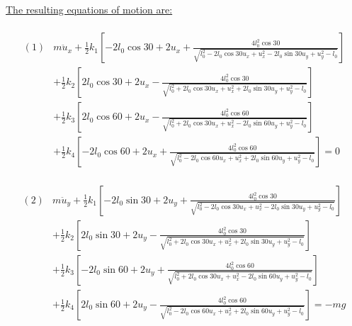 \documentclass[]{report}
\begin{document}
\underline{The resulting equations of motion are:}\\
\\
\begin{eqnarray*}
\left(1\right)& m\ddot{u}_x+\frac{1}{2}k_1 \left[-2l_0 \cos{30}+2u_x+ \frac{4 l_0^2 \cos{30}}{\sqrt{{l_0^2-2l_0 \cos{30} u_x+u_x^2-2 l_0 \sin{30} u_y+u_y^2}-l_0}}\right]\\
& +\frac{1}{2}k_2 \left[2l_0 \cos{30}+2u_x- \frac{4 l_0^2 \cos{30}}{\sqrt{{l_0^2+2l_0 \cos{30} u_x+u_x^2+2 l_0 \sin{30} u_y+u_y^2}-l_0}}\right]\\
&+\frac{1}{2}k_3 \left[2l_0 \cos{60}+2u_x- \frac{4 l_0^2 \cos{60}}{\sqrt{{l_0^2+2l_0 \cos{30} u_x+u_x^2-2 l_0 \sin{60} u_y+u_y^2}-l_0}}\right]\\
&+\frac{1}{2}k_4 \left[-2l_0 \cos{60}+2u_x+ \frac{4 l_0^2 \cos{60}}{\sqrt{{l_0^2-2l_0 \cos{60} u_x+u_x^2+2 l_0 \sin{60} u_y+u_y^2}-l_0}}\right]=0
\end{eqnarray*}
\\
\begin{eqnarray*}
\left(2\right)& m\ddot{u}_y+\frac{1}{2}k_1 \left[-2l_0 \sin{30}+2u_y+ \frac{4 l_0^2 \cos{30}}{\sqrt{{l_0^2-2l_0 \cos{30} u_x+u_x^2-2 l_0 \sin{30} u_y+u_y^2}-l_0}}\right]\\
& +\frac{1}{2}k_2 \left[2l_0 \sin{30}+2u_y- \frac{4 l_0^2 \cos{30}}{\sqrt{{l_0^2+2l_0 \cos{30} u_x+u_x^2+2 l_0 \sin{30} u_y+u_y^2}-l_0}}\right]\\
&+\frac{1}{2}k_3 \left[-2l_0 \sin{60}+2u_y+ \frac{4 l_0^2 \cos{60}}{\sqrt{{l_0^2+2l_0 \cos{30} u_x+u_x^2-2 l_0 \sin{60} u_y+u_y^2}-l_0}}\right]\\
&+\frac{1}{2}k_4 \left[2l_0 \sin{60}+2u_y- \frac{4 l_0^2 \cos{60}}{\sqrt{{l_0^2-2l_0 \cos{60} u_x+u_x^2+2 l_0 \sin{60} u_y+u_y^2}-l_0}}\right]=-mg
\end{eqnarray*}
\end{document}
